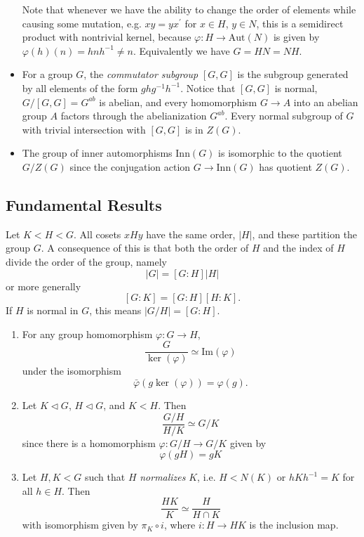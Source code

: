 \documentclass{article}
\begin{document}
\begin{itemize}
{      Note that whenever we have the ability to change the order of
      elements while causing some mutation, e.g. $xy = yx^\prime$ for
      $x \in H$, $y \in N$, this is a semidirect product with
      nontrivial kernel, because $\varphi : H \to \mathrm{Aut}(N)$
      is given by $\varphi(h)(n) = hnh^{-1} \neq n$. Equivalently
      we have $G = HN = NH$.
    }
    \item{
      For a group $G$, the \emph{commutator subgroup} $[G, G]$ is the
      subgroup generated by all elements of the form
      $ghg^{-1}h^{-1}$. Notice that $[G, G]$ is normal, $G / [G, G] = G^{ab}$
      is abelian, and every homomorphism $G \to A$ into an abelian
      group $A$ factors through the abelianization $G^{ab}$. Every
      normal subgroup of $G$ with trivial intersection with $[G, G]$
      is in $Z(G)$.
    }
    \item{
      The group of inner automorphisms $\mathrm{Inn}(G)$ is isomorphic
      to the quotient $G / Z(G)$ since the conjugation action
      $G \to \mathrm{Inn}(G)$ has quotient $Z(G)$.
    }
  \end{itemize}

\subsection{Fundamental Results}
Let $K < H < G$. All cosets $xHy$ have the same order,
$|H|$, and these partition the group $G$. A consequence of this is
that both the order of $H$ and the index of $H$ divide the order of
the group, namely
$$
|G| = [G : H]|H|
$$
or more generally
$$
[G : K] = [G : H][H : K].
$$
If $H$ is normal in $G$, this means $|G / H| = [G : H]$.

\begin{enumerate}
  \item{
    For any group homomorphism $\varphi : G \to H$,
    $$
    \frac{G}{\ker(\varphi)} \simeq \mathrm{Im}(\varphi)
    $$
    under the isomorphism
    $$
    \bar{\varphi}(g \ker(\varphi)) = \varphi(g).
    $$
  }
  \item{
    Let $K \triangleleft G$, $H \triangleleft G$, and $K < H$. Then
    $$
    \frac{G / H}{H / K} \simeq G / K
    $$
    since there is a homomorphism $\varphi : G / H \to G / K$ given by
    $$
    \varphi(gH) = gK
    $$

  }
  \item{
    Let $H, K < G$ such that $H$ \emph{normalizes} $K$, i.e. $H <
    N(K)$ or $hKh^{-1} = K$ for all $h \in H$. Then
    $$
    \frac{HK}{K} \simeq \frac{H}{H \cap K}
    $$
    with isomorphism given by $\pi_K \circ i$, where $i : H \to HK$ is
    the inclusion map.
  }
\end{enumerate}
\end{document}
